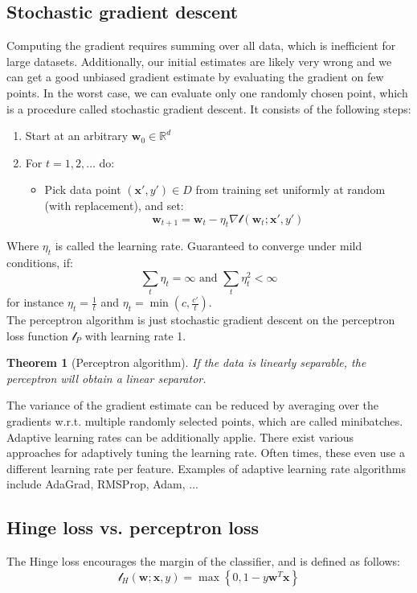 \documentclass[a4paper,10pt,twoside]{article}
\newtheorem{theorem}{Theorem}
\begin{document}
\subsection{Stochastic gradient descent}
Computing the gradient requires summing over all data, which is inefficient for large datasets. Additionally, our initial estimates are likely very wrong and we can get a good unbiased gradient estimate by evaluating the gradient on few points. In the worst case, we can evaluate only one randomly chosen point, which is a procedure called stochastic gradient descent. It consists of the following steps:
\begin{enumerate}
    \item Start at an arbitrary $\mathbf{w}_0\in\mathbb{R}^d$
    \item For $t=1,2,\ldots$ do:
    \begin{itemize}
        \item Pick data point $(\mathbf{x}',y')\in D$ from training set uniformly at random (with replacement), and set:
        \begin{equation*}
            \mathbf{w}_{t+1}=\mathbf{w}_t-\eta_t\nabla\mathcal{l}(\mathbf{w}_t;\mathbf{x}',y')
        \end{equation*}
    \end{itemize}
\end{enumerate}
Where $\eta_t$ is called the learning rate. Guaranteed to converge under mild conditions, if:
\begin{equation*}
    \sum_{t}\eta_t=\infty \text{ and }\sum_{t}\eta_t^2<\infty
\end{equation*}
for instance $\eta_t=\frac{1}{t}$ and $\eta_t=\min (c, \frac{c'}{t})$.\\
The perceptron algorithm is just stochastic gradient descent on the perceptron loss function $\mathcal{l}_P$ with learning rate 1.
\begin{theorem}[Perceptron algorithm]
    If the data is linearly separable, the perceptron will obtain a linear separator.
\end{theorem}
The variance of the gradient estimate can be reduced by averaging over the gradients w.r.t. multiple randomly selected points, which are called minibatches. Adaptive learning rates can be additionally applie. There exist various approaches for adaptively tuning the learning rate. Often times, these even use a different learning rate per feature. Examples of adaptive learning rate algorithms include AdaGrad, RMSProp, Adam, ...
\subsection{Hinge loss vs. perceptron loss}
The Hinge loss encourages the margin of the classifier, and is defined as follows:
\begin{equation*}
    \mathcal{l}_H(\mathbf{w}; \mathbf{x}, y)=\max\left\{0,1-y\mathbf{w}^T\mathbf{x}\right\}
\end{equation*}
\end{document}

